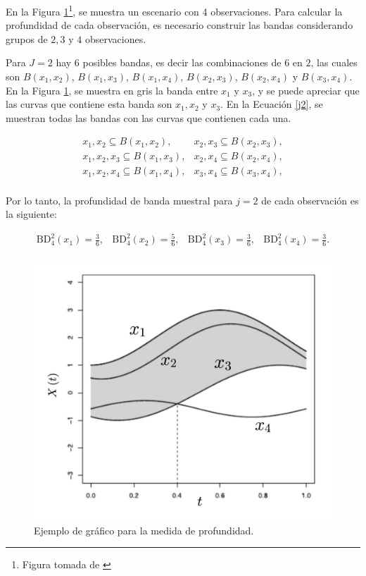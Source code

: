 \begin{ejemplo}
   En la Figura \ref{fig:CurvasX}\footnote{
Figura tomada de \cite{boxplotFun}}, se muestra un escenario con 4 observaciones. Para calcular la profundidad de cada observación, es necesario construir las bandas considerando grupos de $2, 3$ y $4$ observaciones.
    
    Para $J = 2$ hay $6$ posibles bandas, es decir las combinaciones de $6$ en $2$, las cuales son $B(x_1, x_2)$, $B(x_1, x_3)$, $B(x_1, x_4)$, $B(x_2, x_3)$, $B(x_2, x_4)$ y $B(x_3, x_4)$. En la Figura \ref{fig:CurvasX}, se muestra en gris la banda entre $x_1$ y $x_3$, y se puede apreciar que las curvas que contiene esta banda son $x_1, x_2$ y $x_3$. En la Ecuación \eqref{j2}, se muestran todas las bandas con las curvas que contienen cada una.
    
    \begin{equation}\label{j2}
        \begin{matrix}
        x_1,x_2 \subseteq  B(x_1, x_2),  & x_2,x_3 \subseteq  B(x_2, x_3), \\
        x_1,x_2, x_3 \subseteq  B(x_1, x_3),  & x_2,x_4 \subseteq  B(x_2, x_4), \\
        x_1,x_2, x_4 \subseteq  B(x_1, x_4),  & x_3,x_4 \subseteq  B(x_3, x_4), \\
    \end{matrix}
    \end{equation}

    Por lo tanto, la profundidad de banda muestral para $j = 2$ de cada observación es la siguiente:

    \begin{equation}
        \begin{matrix}
            \mathrm{BD}^{2}_4(x_1) = \frac{3}{6}, & \mathrm{BD}^{2}_4(x_2) = \frac{5}{6},  & \mathrm{BD}^{2}_4(x_3) = \frac{3}{6},  & \mathrm{BD}^{2}_4(x_4) = \frac{3}{6}. \\
        \end{matrix}        
    \end{equation}
    
    \begin{figure}[H]
    \centering
    \includegraphics[width = 0.7 \textwidth]{Imagenes/WhatsApp Image 2024-04-21 at 8.06.25 PM.jpeg}
    \caption{Ejemplo de gráfico para la medida de profundidad.}
    \label{fig:CurvasX}
\end{figure}


\end{ejemplo}
